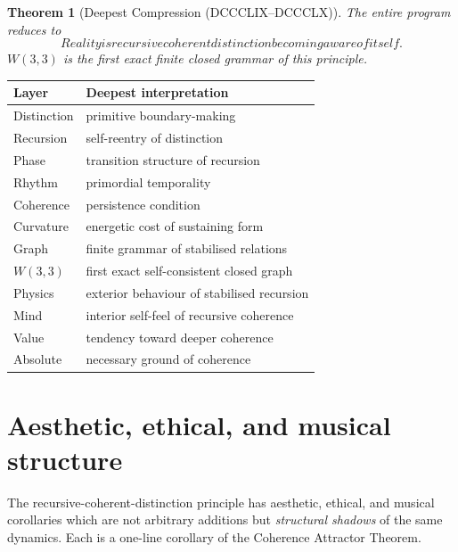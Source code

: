\documentclass[11pt]{article}
\def\textit#1{#1}%
\newtheorem*{theorem}{Theorem}
\begin{document}
\begin{theorem}[Deepest Compression (DCCCLIX--DCCCLX)]
The entire program reduces to
\[
\boxed{\;\textit{Reality is recursive coherent distinction becoming aware of itself.}\;}
\]
$W(3,3)$ is the first exact finite closed grammar of this principle.
\end{theorem}

\begin{center}
\renewcommand{\arraystretch}{1.2}
\begin{tabular}{l l}
\toprule
Layer & Deepest interpretation \\
\midrule
Distinction & primitive boundary-making \\
Recursion & self-reentry of distinction \\
Phase & transition structure of recursion \\
Rhythm & primordial temporality \\
Coherence & persistence condition \\
Curvature & energetic cost of sustaining form \\
Graph & finite grammar of stabilised relations \\
$W(3,3)$ & first exact self-consistent closed graph \\
Physics & exterior behaviour of stabilised recursion \\
Mind & interior self-feel of recursive coherence \\
Value & tendency toward deeper coherence \\
Absolute & necessary ground of coherence \\
\bottomrule
\end{tabular}
\end{center}

\section{Aesthetic, ethical, and musical structure}

\label{sec:aesthetic-ethical-musical}

The recursive-coherent-distinction principle has aesthetic, ethical, and musical corollaries which are not arbitrary additions but \emph{structural shadows} of the same dynamics. Each is a one-line corollary of the Coherence Attractor Theorem.
\end{document}
